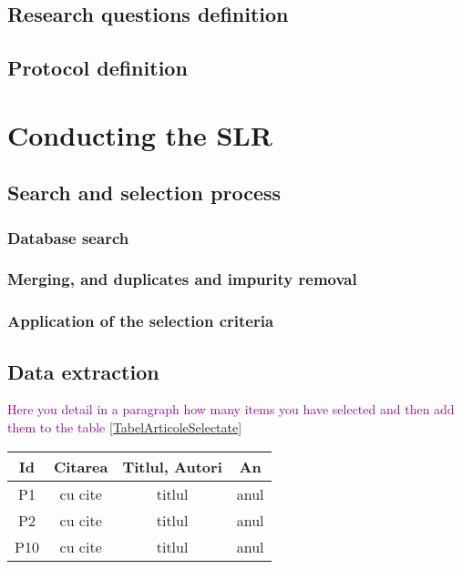 \documentclass[a4paper,fleqn]{cas-dc}
\begin{document}
\subsection{Research questions definition}

\subsection{Protocol definition}


\section{Conducting the SLR}
\subsection{Search and selection process}
\subsubsection{Database search}
\subsubsection{Merging, and duplicates and impurity removal}
\subsubsection{Application of the selection criteria}    

\subsection{Data extraction}

\textcolor{darkmagenta}{Here you detail in a paragraph how many items you have selected and then add them to the table  \ref{TabelArticoleSelectate}}

\begin{table*}[htbp]
    \begin{center}
    \begin{tabular}{ |c|c|c|c| } 
    \hline
    \textbf{Id} & \textbf{Citarea} & \textbf{Titlul, Autori} & \textbf{An} \\
    \hline
    P1 & cu cite & titlul & anul \\
    \hline
    P2 & cu cite & titlul & anul \\
    \hline
    P10 & cu cite & titlul & anul \\
    \hline
    \end{tabular}
    \end{center}
   \caption{Lista articolelor selectate }
    \label{TabelArticoleSelectate}
\end{table*}
\end{document}
